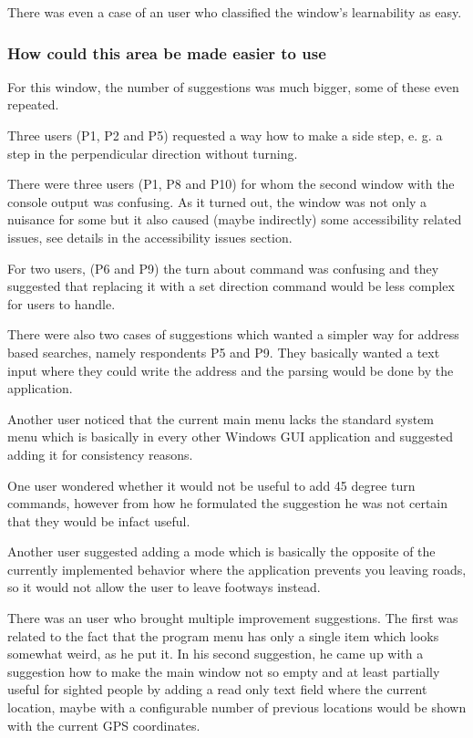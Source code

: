 \documentclass[nolof,digital]{fithesis3}
\begin{document}
There was even a case of an user who classified the window's learnability as easy.
\subsubsection{How could this area be made easier to use}
For this window, the number of suggestions was much bigger, some of these even repeated.

Three users (P1, P2 and P5) requested a way how to make a side step, e. g. a step in the perpendicular direction without turning.

There were three users (P1, P8 and P10) for whom the second window with the console output was confusing. As it turned out, the window was not only a nuisance for some but it also caused (maybe indirectly) some accessibility related issues, see details in the accessibility issues section.

For two users, (P6 and P9) the turn about command was confusing and they suggested that replacing it with a set direction command would be less complex for users to handle.

There were also two cases of suggestions which wanted a simpler way for address based searches, namely respondents P5 and P9. They basically wanted a text input where they could write the address and the parsing would be done by the application.

Another user noticed that the current main menu lacks the standard system menu which is basically in every other Windows GUI application and suggested adding it for consistency reasons.

One user wondered whether it would not be useful to add 45 degree turn commands, however from how he formulated the suggestion he was not certain that they would be infact useful.

Another user suggested adding a mode which is basically the opposite of the currently implemented behavior where the application prevents you leaving roads, so it would not allow the user to leave footways instead.

There was an user who brought multiple improvement suggestions. The first was related to the fact that the program menu has only a single item which looks somewhat weird, as he put it. In his second suggestion, he came up with a suggestion how to make the main window not so empty and at least partially useful for sighted people by adding a read only text field where the current location, maybe with a configurable number of previous locations would be shown with the current GPS coordinates.
\end{document}
